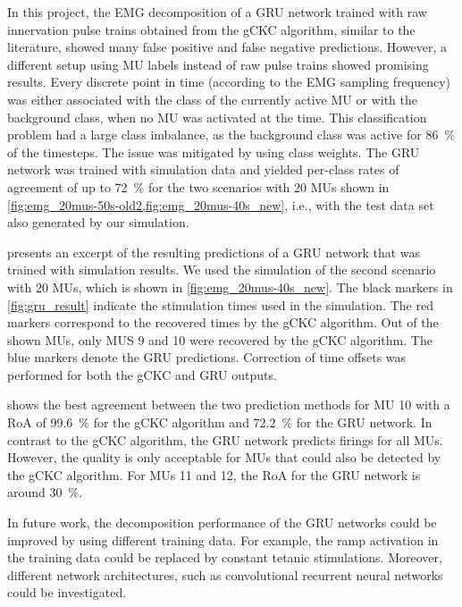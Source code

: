 In this project, the EMG decomposition of a GRU network trained with raw innervation pulse trains obtained from the gCKC algorithm, similar to the literature, showed many false positive and false negative predictions.
However, a different setup using MU labels instead of raw pulse trains showed promising results. 
Every discrete point in time (according to the EMG sampling frequency) was either associated with the class of the currently active MU or with the background class, when no MU was activated at the time. This classification problem had a large class imbalance, as the background class was active for \SI{86}{\percent} of the timesteps. The issue was mitigated by using class weights. The GRU network was trained with simulation data and yielded per-class rates of agreement of up to \SI{72}{\percent} for the two scenarios with 20 MUs shown in \cref{fig:emg_20mus-50s-old2,fig:emg_20mus-40s_new}, i.e., with the test data set also generated by our simulation.

 presents an excerpt of the resulting predictions of a GRU network that was trained with simulation results.
We used the simulation of the second scenario with 20 MUs, which is shown in \cref{fig:emg_20mus-40s_new}. 
The black markers in \cref{fig:gru_result} indicate the stimulation times used in the simulation. 
The red markers correspond to the recovered times by the gCKC algorithm. 
Out of the shown MUs, only MUS 9 and 10 were recovered by the gCKC algorithm.
The blue markers denote the GRU predictions. Correction of time offsets was performed for both the gCKC and GRU outputs.

 shows the best agreement between the two prediction methods for MU 10 with a RoA of \SI{99.6}{\percent} for the gCKC algorithm and \SI{72.2}{\percent} for the GRU network. In contrast to the gCKC algorithm, the GRU network predicts firings for all MUs. However, the quality is only acceptable for MUs that could also be detected by the gCKC algorithm. For MUs 11 and 12, the RoA for the GRU network is around \SI{30}{\percent}.

In future work, the decomposition performance of the GRU networks could be improved by using different training data. For example, the ramp activation in the training data could be replaced by constant tetanic stimulations. Moreover, different network architectures, such as convolutional recurrent neural networks could be investigated.

